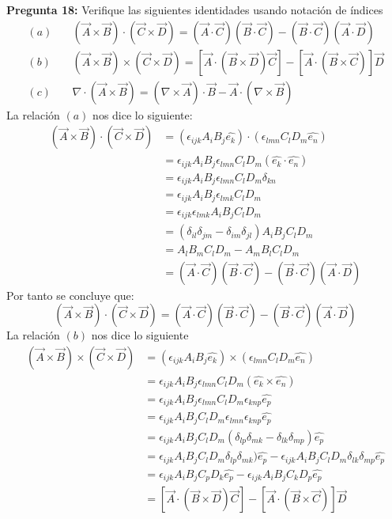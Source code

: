 \documentclass[11pt,letterpaper]{article}
\begin{document}
\textbf{Pregunta 18:} Verifique las siguientes identidades usando notación de índices
\begin{align*}
    (a) & \quad (\vec{A}\times \vec{B})\cdot (\vec{C}\times\vec{D}) = (\vec{A}\cdot \vec{C})(\vec{B}\cdot\vec{C}) - (\vec{B}\cdot \vec{C}) (\vec{A}\cdot \vec{D}) \\
    (b) & \quad (\vec{A}\times \vec{B})\times (\vec{C}\times\vec{D}) = [\vec{A}\cdot (\vec{B} \times \vec{D})\vec{C}]- [\vec{A}\cdot (\vec{B}\times\vec{C})]\vec{D} \\
    (c) & \quad \nabla \cdot (\vec{A}\times \vec{B}) = (\nabla \times \vec{A})\cdot \vec{B}  - \vec{A} \cdot (\nabla \times \vec{B}) 
\end{align*}
La relación $(a)$ nos dice lo siguiente:
\begin{align*}
    (\vec{A}\times \vec{B})\cdot (\vec{C}\times\vec{D}) & = (\epsilon_{ijk}A_iB_j\hat{e_k})\cdot (\epsilon_{lmn}C_lD_m\hat{e_n}) \\
    & = \epsilon_{ijk}A_iB_j\epsilon_{lmn}C_lD_m(\hat{e_k}\cdot\hat{e_n}) \\
    & = \epsilon_{ijk}A_iB_j\epsilon_{lmn}C_lD_m\delta_{kn} \\
    & = \epsilon_{ijk}A_iB_j\epsilon_{lmk}C_lD_m \\
    & = \epsilon_{ijk}\epsilon_{lmk} A_iB_jC_lD_m \\
    & = (\delta_{il}\delta_{jm}-\delta_{im}\delta_{jl})A_iB_jC_lD_m \\
    & = A_lB_mC_lD_m - A_mB_lC_lD_m \\
    & = (\vec{A}\cdot \vec{C})(\vec{B}\cdot\vec{C}) - (\vec{B}\cdot \vec{C}) (\vec{A}\cdot \vec{D}) 
\end{align*}
Por tanto se concluye que:
\begin{equation}
    (\vec{A}\times \vec{B})\cdot (\vec{C}\times\vec{D}) = (\vec{A}\cdot \vec{C})(\vec{B}\cdot\vec{C}) - (\vec{B}\cdot \vec{C}) (\vec{A}\cdot \vec{D}) 
\end{equation}
La relación $(b)$ nos dice lo siguiente
\begin{align*}
    (\vec{A}\times \vec{B})\times (\vec{C}\times\vec{D})  & = (\epsilon_{ijk}A_iB_j\hat{e_k})\times (\epsilon_{lmn}C_lD_m\hat{e_n}) \\
    & = \epsilon_{ijk}A_iB_j \epsilon_{lmn}C_lD_m  (\hat{e_k}\times \hat{e_n} ) \\
    & = \epsilon_{ijk}A_iB_j \epsilon_{lmn}C_lD_m \epsilon_{knp} \hat{e_p} \\
    & = \epsilon_{ijk}A_iB_jC_lD_m\epsilon_{lmn}\epsilon_{knp}\hat{e_p} \\
    & = \epsilon_{ijk}A_iB_jC_lD_m (\delta_{lp}\delta_{mk}-\delta_{lk}\delta_{mp})\hat{e_p} \\
    & =   \epsilon_{ijk}A_iB_jC_lD_m\delta_{lp}\delta_{mk})\hat{e_p} -\epsilon_{ijk}A_iB_jC_lD_m \delta_{lk}\delta_{mp} \hat{e_p}\\
    & =   \epsilon_{ijk}A_iB_jC_pD_k \hat{e_p}-\epsilon_{ijk}A_iB_jC_kD_p \hat{e_p} \\
    & = [\vec{A}\cdot (\vec{B} \times \vec{D})\vec{C}]- [\vec{A}\cdot (\vec{B}\times\vec{C})]\vec{D} 
\end{align*}
\end{document}
